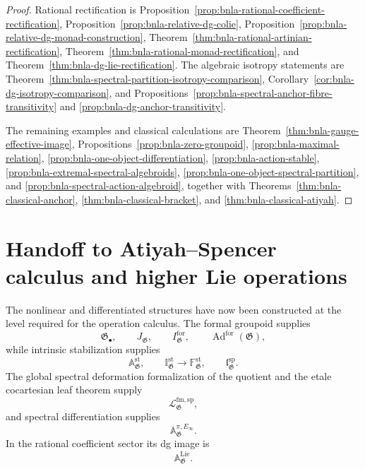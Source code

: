 \begin{proof}
Rational rectification is
Proposition~\ref{prop:bnla-rational-coefficient-rectification},
Proposition~\ref{prop:bnla-relative-dg-colie},
Proposition~\ref{prop:bnla-relative-dg-monad-construction},
Theorem~\ref{thm:bnla-rational-artinian-rectification},
Theorem~\ref{thm:bnla-rational-monad-rectification}, and
Theorem~\ref{thm:bnla-dg-lie-rectification}.  The algebraic isotropy statements are
Theorem~\ref{thm:bnla-spectral-partition-isotropy-comparison},
Corollary~\ref{cor:bnla-dg-isotropy-comparison}, and
Propositions~\ref{prop:bnla-spectral-anchor-fibre-transitivity} and
\ref{prop:bnla-dg-anchor-transitivity}.

The remaining examples and classical calculations are
Theorem~\ref{thm:bnla-gauge-effective-image},
Propositions~\ref{prop:bnla-zero-groupoid},
\ref{prop:bnla-maximal-relation},
\ref{prop:bnla-one-object-differentiation},
\ref{prop:bnla-action-stable},
\ref{prop:bnla-extremal-spectral-algebroids},
\ref{prop:bnla-one-object-spectral-partition}, and
\ref{prop:bnla-spectral-action-algebroid}, together with
Theorems~\ref{thm:bnla-classical-anchor},
\ref{thm:bnla-classical-bracket}, and
\ref{thm:bnla-classical-atiyah}.
\end{proof}

\section{Handoff to Atiyah--Spencer calculus and higher Lie operations}
\label{sec:bnla-handoff-spencer}

The nonlinear and differentiated structures have now been constructed at the
level required for the operation calculus.  The formal groupoid supplies
\[
    \mathfrak G_\bullet,
    \qquad
    J_{\mathfrak G},
    \qquad
    I^{\mathrm{for}}_{\mathfrak G},
    \qquad
    \operatorname{Ad}^{\mathrm{for}}(\mathfrak G),
\]
while intrinsic stabilization supplies
\[
    \mathbb A^{\mathrm{st}}_{\mathfrak G},
    \qquad
    \mathbb I^{\mathrm{st}}_{\mathfrak G}
    \longrightarrow
    \mathbb F^{\mathrm{st}}_{\mathfrak G},
    \qquad
    \mathfrak l^{\mathrm{sp}}_{\mathfrak G}.
\]
The global spectral deformation formalization of the quotient and the
etale cocartesian leaf theorem supply
\[
    \mathcal L^{\mathrm{fm,sp}}_{\mathfrak G},
\]
and spectral differentiation supplies
\[
    \mathbb A^{\pi,E_\infty}_{\mathfrak G}.
\]
In the rational coefficient sector its dg image is
\[
    \mathbb A^{\mathrm{Lie}}_{\mathfrak G}.
\]

